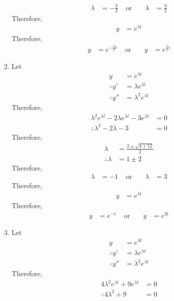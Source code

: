 \documentclass[fleqn, a4paper, 11pt, oneside]{amsart}
\theoremstyle{definition}
\theoremstyle{theorem}
\begin{document}
\begin{solution}
\begin{enumerate}[leftmargin = *]
			\begin{align*}
				\lambda & = -\frac{3}{2} & \text{ or } &  & \lambda & = \frac{3}{2}
			\end{align*}
			Therefore,
			\begin{align*}
				y & = e^{\lambda t}
			\end{align*}
			Therefore,
			\begin{align*}
				y & = e^{-\frac{3}{2} t} & \text{ or } &  & y & = e^{\frac{3}{2} t}
			\end{align*}
		\item
			Let
			\begin{align*}
				y              & = e^{\lambda t}         \\
				\therefore y'  & = \lambda e^{\lambda t} \\
				\therefore y'' & = \lambda^2 e^{\lambda t}
			\end{align*}
			Therefore,
			\begin{align*}
				\lambda^2 e^{\lambda t} - 2 \lambda e^{\lambda t} - 3 e^{\lambda t} & = 0 \\
				\therefore \lambda^2 - 2 \lambda - 3                                & = 0
			\end{align*}
			Therefore,
			\begin{align*}
				\lambda            & = \frac{2 \pm \sqrt{4 + 12}}{2} \\
				\therefore \lambda & = 1 \pm 2
			\end{align*}
			Therefore,
			\begin{align*}
				\lambda & = -1 & \text{ or } &  & \lambda & = 3
			\end{align*}
			Therefore,
			\begin{align*}
				y & = e^{\lambda t}
			\end{align*}
			Therefore,
			\begin{align*}
				y & = e^{-t} & \text{ or } &  & y & = e^{3 t}
			\end{align*}
		\item
			Let
			\begin{align*}
				y              & = e^{\lambda t}         \\
				\therefore y'  & = \lambda e^{\lambda t} \\
				\therefore y'' & = \lambda^2 e^{\lambda t}
			\end{align*}
			Therefore,
			\begin{align*}
				4 \lambda^2 e^{\lambda t} + 9 e^{\lambda t} & = 0 \\
				\therefore 4 \lambda^2 + 9                  & = 0

\end{align*}
\end{enumerate}
\end{solution}
\end{document}

